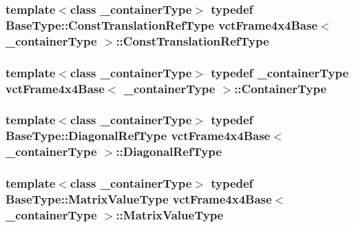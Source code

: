 \hypertarget{classvct_frame4x4_base_a720869bcd28db8ef2f9f13294097e99e}{
\subsubsection[{Const\-Translation\-Ref\-Type}]{\setlength{\rightskip}{0pt plus 5cm}template$<$class \-\_\-container\-Type$>$ typedef Base\-Type\-::\-Const\-Translation\-Ref\-Type {\bf vct\-Frame4x4\-Base}$<$ \-\_\-container\-Type $>$\-::{\bf Const\-Translation\-Ref\-Type}}}\label{classvct_frame4x4_base_a720869bcd28db8ef2f9f13294097e99e}
\hypertarget{classvct_frame4x4_base_a3ae00d9c053676770458dc28ad41cc5a}{
\subsubsection[{Container\-Type}]{\setlength{\rightskip}{0pt plus 5cm}template$<$class \-\_\-container\-Type$>$ typedef \-\_\-container\-Type {\bf vct\-Frame4x4\-Base}$<$ \-\_\-container\-Type $>$\-::{\bf Container\-Type}}}\label{classvct_frame4x4_base_a3ae00d9c053676770458dc28ad41cc5a}
\hypertarget{classvct_frame4x4_base_a838fede6632e0623204c42f3e49bce96}{
\subsubsection[{Diagonal\-Ref\-Type}]{\setlength{\rightskip}{0pt plus 5cm}template$<$class \-\_\-container\-Type$>$ typedef {\bf Base\-Type\-::\-Diagonal\-Ref\-Type} {\bf vct\-Frame4x4\-Base}$<$ \-\_\-container\-Type $>$\-::{\bf Diagonal\-Ref\-Type}}}\label{classvct_frame4x4_base_a838fede6632e0623204c42f3e49bce96}
\hypertarget{classvct_frame4x4_base_a46b60268d306fa5edcfc229da61501ca}{
\subsubsection[{Matrix\-Value\-Type}]{\setlength{\rightskip}{0pt plus 5cm}template$<$class \-\_\-container\-Type$>$ typedef Base\-Type\-::\-Matrix\-Value\-Type {\bf vct\-Frame4x4\-Base}$<$ \-\_\-container\-Type $>$\-::{\bf Matrix\-Value\-Type}}}\label{classvct_frame4x4_base_a46b60268d306fa5edcfc229da61501ca}
